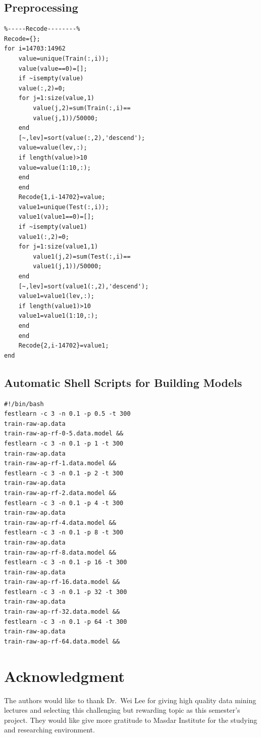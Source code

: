 \documentclass[journal]{IEEEtran}
\begin{document}
\subsection{Preprocessing}
\label{sec:preprocessing-1}
\begin{verbatim}
%-----Recode--------%
Recode={};
for i=14703:14962
    value=unique(Train(:,i));
    value(value==0)=[];
    if ~isempty(value)
    value(:,2)=0;
    for j=1:size(value,1)
        value(j,2)=sum(Train(:,i)==
        value(j,1))/50000;
    end
    [~,lev]=sort(value(:,2),'descend');
    value=value(lev,:);
    if length(value)>10
    value=value(1:10,:);
    end
    end
    Recode{1,i-14702}=value;
    value1=unique(Test(:,i));
    value1(value1==0)=[];
    if ~isempty(value1)
    value1(:,2)=0;
    for j=1:size(value1,1)
        value1(j,2)=sum(Test(:,i)==
        value1(j,1))/50000;
    end
    [~,lev]=sort(value1(:,2),'descend');
    value1=value1(lev,:);
    if length(value1)>10
    value1=value1(1:10,:);
    end
    end
    Recode{2,i-14702}=value1;   
end
\end{verbatim}



\subsection{Automatic Shell Scripts for Building Models}
\label{sec:autom-shell-scripts}


\begin{verbatim}
#!/bin/bash
festlearn -c 3 -n 0.1 -p 0.5 -t 300 
train-raw-ap.data 
train-raw-ap-rf-0-5.data.model &&
festlearn -c 3 -n 0.1 -p 1 -t 300 
train-raw-ap.data 
train-raw-ap-rf-1.data.model &&
festlearn -c 3 -n 0.1 -p 2 -t 300 
train-raw-ap.data 
train-raw-ap-rf-2.data.model &&
festlearn -c 3 -n 0.1 -p 4 -t 300 
train-raw-ap.data 
train-raw-ap-rf-4.data.model &&
festlearn -c 3 -n 0.1 -p 8 -t 300 
train-raw-ap.data 
train-raw-ap-rf-8.data.model &&
festlearn -c 3 -n 0.1 -p 16 -t 300 
train-raw-ap.data 
train-raw-ap-rf-16.data.model &&
festlearn -c 3 -n 0.1 -p 32 -t 300 
train-raw-ap.data 
train-raw-ap-rf-32.data.model &&
festlearn -c 3 -n 0.1 -p 64 -t 300 
train-raw-ap.data 
train-raw-ap-rf-64.data.model &&
\end{verbatim}

\section*{Acknowledgment}


The authors would like to thank Dr.\ Wei Lee for giving high quality data mining lectures and selecting this challenging but rewarding topic as this semester's project. They would like give more gratitude to Masdar Institute for the studying and researching environment.
\end{document}
